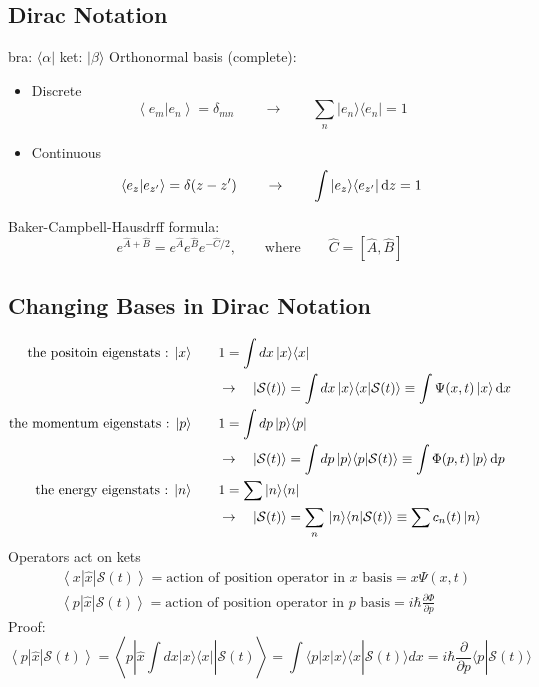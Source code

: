 \subsection{Dirac Notation}
bra: \(\langle \alpha|\) \newline
ket: \(|\beta\rangle\)  \newline
Orthonormal basis (complete):
\begin{itemize}
	\item Discrete \[
	\left\langle e_m|e_n \right\rangle =\delta_{mn} \qquad \rightarrow \qquad \sum_n |e_n\rangle\langle e_n|=1 
	\]
	\item Continuous \[
	\left\langle e_z|e_{z'} \right\rangle =\delta(z-z') \qquad\rightarrow\qquad\int  |e_z\rangle\langle e_{z'}|\,{\rm d}z=1 
	\]
\end{itemize}
Baker-Campbell-Hausdrff formula:
\[e^{\hat{A}+\hat{B}}=e^{\hat{A}}e^{\hat{B}}e^{-\hat{C}/2},\qquad\text{where}\qquad
\hat{C}=\left[\hat{A},\hat{B}\right] 
\]
\subsection{Changing Bases in Dirac Notation}
\[\begin{aligned}
	\text{the positoin eigenstats : } |x\rangle \qquad &1= \int dx\,|x\rangle\langle x| \\
	&\rightarrow\quad |\mathcal{S}(t)\rangle=\int dx\,|x\rangle\langle x|\mathcal{S}(t)\rangle\equiv\int\Psi(x,t)\,|x\rangle\,{\rm d}x \\
	\text{the momentum eigenstats : } |p\rangle \qquad &1= \int dp\,|p\rangle\langle p| \\
	&\rightarrow\quad |\mathcal{S}(t)\rangle=\int dp\,|p\rangle\langle p|\mathcal{S}(t)\rangle\equiv\int\Phi(p,t)\,|p\rangle\,{\rm d}p \\
	\text{the energy eigenstats : } |n\rangle \qquad &1= \sum |n\rangle\langle n| \\
	&\rightarrow\quad |\mathcal{S}(t)\rangle=\sum_n\,|n\rangle\langle n|\mathcal{S}(t)\rangle\equiv\sum c_n(t)\,|n\rangle\\
\end{aligned}\]
Operators act on kets\[\begin{aligned}
	&\left\langle x|\hat{x}|\mathcal{S}(t)\right\rangle  = \text{action of position operator in } x \text{ basis} = x\Psi(x,t) \\
	&\left\langle p|\hat{x}|\mathcal{S}(t)\right\rangle  = \text{action of position operator in } p \text{ basis} = i\hbar\frac{\partial \Phi}{\partial p}
\end{aligned}\]
Proof: \[
\left\langle p|\hat{x}|\mathcal{S}(t)\right\rangle  
= \left\langle p \left\lvert \hat{x}  \int dx |x\rangle\langle x| \right\rvert\mathcal{S}(t)\right\rangle 
= \int \langle p|x|x\rangle \langle x|\mathcal{S}(t)\rangle dx = i\hbar\frac{\partial}{\partial p}\langle p|\mathcal{S}(t)\rangle
\]
